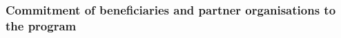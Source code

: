 







%
%
%
%
%
%

\subsubsection{Commitment of beneficiaries and partner organisations to the program}

